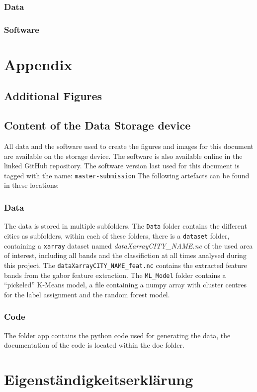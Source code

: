 \documentclass[12pt,a4paper, english,twoside]{article}
\begin{document}
\subsubsection{Data}


\subsubsection{Software}


\section{Appendix}
  \subsection{Additional Figures}
  \subsection{Content of the Data Storage device}
    All data and the software used to create the figures and images for this document are available on the storage device.
    The software is also available online in the linked GitHub repository.
    The software version last used for this document is tagged with the name: \texttt{master-submission}
    The following artefacts can be found in these locations:
  \subsubsection{Data}
    The data is stored in multiple subfolders. 
    The \texttt{Data} folder contains the different cities as subfolders, within each of these folders, there is a \texttt{dataset} folder, containing a \texttt{xarray} dataset named \textit{dataXarrayCITY\_NAME.nc} of the used area of interest, including all bands and the classifiction at all times analysed during this project. 
    The \texttt{dataXarrayCITY\_NAME\_feat.nc} contains the extracted feature bands from the gabor feature extraction.
    The \texttt{ML\_Model} folder contains a ``pickeled'' K-Means model, a file containing a numpy array with cluster centres for the label assignment and the random forest model. %
  \subsubsection{Code}
    The folder app contains the python code used for generating the data, the documentation of the code is located within the doc folder.
\newpage
\printbibliography%
\newpage
\section*{Eigenständigkeitserklärung}

\end{document}
